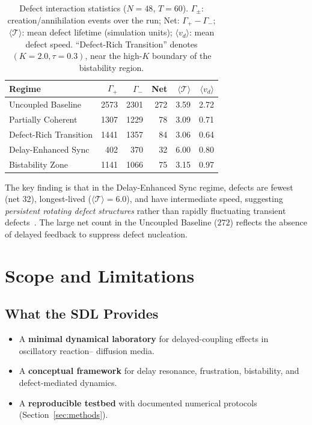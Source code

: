 \documentclass[11pt,a4paper]{article}
\begin{document}
\begin{table}[htbp]
\centering
\caption{%
  Defect interaction statistics ($N=48$, $T=60$).
  $\Gamma_\pm$: creation/annihilation events over the run;
  Net: $\Gamma_+ - \Gamma_-$;
  $\langle\mathcal{T}\rangle$: mean defect lifetime
  (simulation units);
  $\langle v_d \rangle$: mean defect speed.
  ``Defect-Rich Transition'' denotes $(K=2.0,\tau=0.3)$, near the
  high-$K$ boundary of the bistability region.%
}
\label{tab:ecology}
\begin{tabular}{@{}lrrrrr@{}}
\toprule
\textbf{Regime} &
  $\Gamma_+$ & $\Gamma_-$ & Net &
  $\langle\mathcal{T}\rangle$ & $\langle v_d \rangle$ \\
\midrule
Uncoupled Baseline & 2573 & 2301 & 272 & 3.59 & 2.72 \\
Partially Coherent   & 1307 & 1229 & \phantom{0}78 & 3.09 & 0.71 \\
Defect-Rich Transition         & 1441 & 1357 & \phantom{0}84 & 3.06 & 0.64 \\
Delay-Enhanced Sync&  402 &  370 & \phantom{0}32 & 6.00 & 0.80 \\
Bistability Zone   & 1141 & 1066 & \phantom{0}75 & 3.15 & 0.97 \\
\bottomrule
\end{tabular}
\end{table}

The key finding is that in the Delay-Enhanced Sync regime,
defects are fewest (net 32), longest-lived ($\langle\mathcal{T}
\rangle = 6.0$), and have intermediate speed, suggesting
\emph{persistent rotating defect structures} rather than rapidly
fluctuating transient defects~\cite{Coullet1989,Aranson2002}.
The large net count in the
Uncoupled Baseline ($272$) reflects the absence of delayed
feedback to suppress defect nucleation.

\section{Scope and Limitations}
\label{sec:boundaries}

\subsection{What the SDL Provides}
\begin{itemize}
    \item A \textbf{minimal dynamical laboratory} for
          delayed-coupling effects in oscillatory reaction--
          diffusion media.
    \item A \textbf{conceptual framework} for delay resonance,
          frustration, bistability, and defect-mediated dynamics.
    \item A \textbf{reproducible testbed} with documented
          numerical protocols (Section~\ref{sec:methods}).
\end{itemize}
\end{document}
